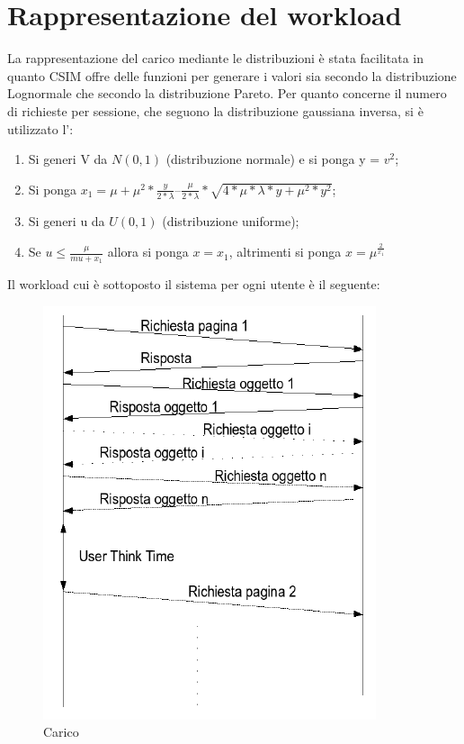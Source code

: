 \section{Rappresentazione del workload}
La rappresentazione del carico mediante le distribuzioni è stata facilitata in quanto CSIM offre delle funzioni per generare i valori sia secondo la distribuzione Lognormale che secondo la distribuzione Pareto. Per quanto concerne il numero di richieste per sessione, che seguono la distribuzione gaussiana inversa, si è utilizzato l':
\begin{enumerate}
	\item Si generi V da $N(0,1)$ (distribuzione normale) e si ponga y = $v^{2}$;
	\item Si ponga $x_{1} =  \mu + \mu^{2}*\frac{y}{2*\lambda} – \frac{\mu}{2*\lambda} * \sqrt{4*\mu*\lambda*y+\mu^{2}*y^{2}}$;
	\item Si generi u da $U(0,1)$ (distribuzione uniforme);
	\item Se $u \leq \frac{\mu}{mu+x_{1}}$ allora si ponga $x = x_{1}$, altrimenti si ponga $x = \mu^{\frac{2}{x_{1}}}$
\end{enumerate}
Il workload cui è sottoposto il sistema per ogni utente è il seguente:
\begin{figure}[H]
\begin{center}
\includegraphics[scale=0.7]{etc/carico.png}
\caption{Carico}
\label{carico}
\end{center}
\end{figure}
